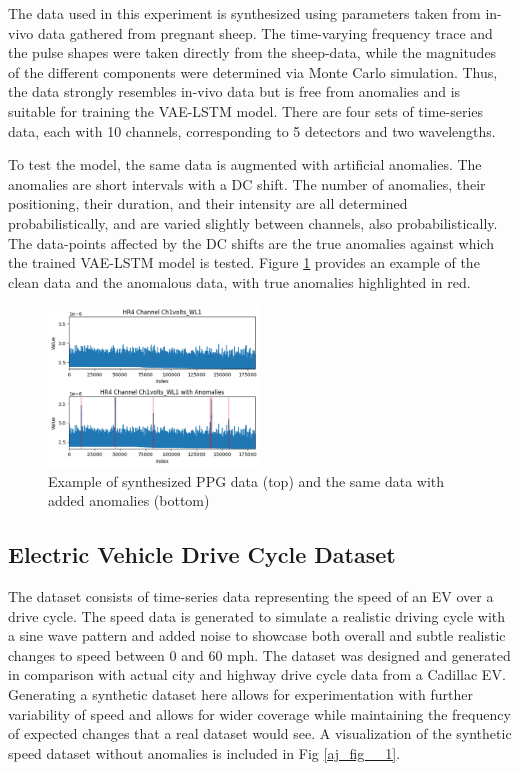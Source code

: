 \documentclass[conference]{IEEEtran}
\begin{document}
The data used in this experiment is synthesized using parameters taken from in-vivo data gathered from pregnant sheep. The time-varying frequency trace and the pulse shapes were taken directly from the sheep-data, while the magnitudes of the different components were determined via Monte Carlo simulation. Thus, the data strongly resembles in-vivo data but is free from anomalies and is suitable for training the VAE-LSTM model. There are four sets of time-series data, each with 10 channels, corresponding to 5 detectors and two wavelengths.

To test the model, the same data is augmented with artificial anomalies. The anomalies are short intervals with a DC shift. The number of anomalies, their positioning, their duration, and their intensity are all determined probabilistically, and are varied slightly between channels, also probabilistically. The data-points affected by the DC shifts are the true anomalies against which the trained VAE-LSTM model is tested. Figure \ref{ck_fig_1} provides an example of the clean data and the anomalous data, with true anomalies highlighted in red.

\begin{figure}[htbp]
    \centering
    \includegraphics[width=0.5\textwidth]{ck_fig_1.png}
    \caption{Example of synthesized PPG data (top) and the same data with added anomalies (bottom)}
    \label{ck_fig_1}
\end{figure}

\subsection{Electric Vehicle Drive Cycle Dataset}
The dataset consists of time-series data representing the speed of an EV over a drive cycle. The speed data is generated to simulate a realistic driving cycle with a sine wave pattern and added noise to showcase both overall and subtle realistic changes to speed between 0 and 60 mph. The dataset was designed and generated in comparison with actual city and highway drive cycle data from a Cadillac EV. Generating a synthetic dataset here allows for experimentation with further variability of speed and allows for wider coverage while maintaining the frequency of expected changes that a real dataset would see. A visualization of the synthetic speed dataset without anomalies is included in Fig \ref{aj_fig__1}.
\end{document}
